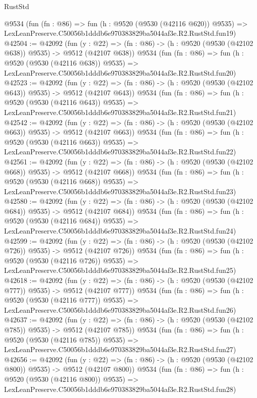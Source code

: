 \begin{lexlean}{RustStd}
\begin{coremodule}
    @9534
    (fun (fn : @86) =>
    fun (h : @9520 (@9530 (@42116 @620)) @9535) =>
    LexLeanPreserve.C50056b1dddb6e970383829ba5044af3e.R2.RustStd.fun19)
@42504 := @42092
    (fun (y : @22) => (fn : @86) -> (h : @9520 (@9530 (@42102 @638)) @9535) -> @9512 (@42107 @638))
    @9534
    (fun (fn : @86) =>
    fun (h : @9520 (@9530 (@42116 @638)) @9535) =>
    LexLeanPreserve.C50056b1dddb6e970383829ba5044af3e.R2.RustStd.fun20)
@42523 := @42092
    (fun (y : @22) => (fn : @86) -> (h : @9520 (@9530 (@42102 @643)) @9535) -> @9512 (@42107 @643))
    @9534
    (fun (fn : @86) =>
    fun (h : @9520 (@9530 (@42116 @643)) @9535) =>
    LexLeanPreserve.C50056b1dddb6e970383829ba5044af3e.R2.RustStd.fun21)
@42542 := @42092
    (fun (y : @22) => (fn : @86) -> (h : @9520 (@9530 (@42102 @663)) @9535) -> @9512 (@42107 @663))
    @9534
    (fun (fn : @86) =>
    fun (h : @9520 (@9530 (@42116 @663)) @9535) =>
    LexLeanPreserve.C50056b1dddb6e970383829ba5044af3e.R2.RustStd.fun22)
@42561 := @42092
    (fun (y : @22) => (fn : @86) -> (h : @9520 (@9530 (@42102 @668)) @9535) -> @9512 (@42107 @668))
    @9534
    (fun (fn : @86) =>
    fun (h : @9520 (@9530 (@42116 @668)) @9535) =>
    LexLeanPreserve.C50056b1dddb6e970383829ba5044af3e.R2.RustStd.fun23)
@42580 := @42092
    (fun (y : @22) => (fn : @86) -> (h : @9520 (@9530 (@42102 @684)) @9535) -> @9512 (@42107 @684))
    @9534
    (fun (fn : @86) =>
    fun (h : @9520 (@9530 (@42116 @684)) @9535) =>
    LexLeanPreserve.C50056b1dddb6e970383829ba5044af3e.R2.RustStd.fun24)
@42599 := @42092
    (fun (y : @22) => (fn : @86) -> (h : @9520 (@9530 (@42102 @726)) @9535) -> @9512 (@42107 @726))
    @9534
    (fun (fn : @86) =>
    fun (h : @9520 (@9530 (@42116 @726)) @9535) =>
    LexLeanPreserve.C50056b1dddb6e970383829ba5044af3e.R2.RustStd.fun25)
@42618 := @42092
    (fun (y : @22) => (fn : @86) -> (h : @9520 (@9530 (@42102 @777)) @9535) -> @9512 (@42107 @777))
    @9534
    (fun (fn : @86) =>
    fun (h : @9520 (@9530 (@42116 @777)) @9535) =>
    LexLeanPreserve.C50056b1dddb6e970383829ba5044af3e.R2.RustStd.fun26)
@42637 := @42092
    (fun (y : @22) => (fn : @86) -> (h : @9520 (@9530 (@42102 @785)) @9535) -> @9512 (@42107 @785))
    @9534
    (fun (fn : @86) =>
    fun (h : @9520 (@9530 (@42116 @785)) @9535) =>
    LexLeanPreserve.C50056b1dddb6e970383829ba5044af3e.R2.RustStd.fun27)
@42656 := @42092
    (fun (y : @22) => (fn : @86) -> (h : @9520 (@9530 (@42102 @800)) @9535) -> @9512 (@42107 @800))
    @9534
    (fun (fn : @86) =>
    fun (h : @9520 (@9530 (@42116 @800)) @9535) =>
    LexLeanPreserve.C50056b1dddb6e970383829ba5044af3e.R2.RustStd.fun28)

\end{coremodule}
\end{lexlean}
